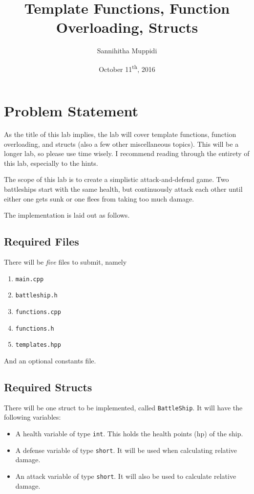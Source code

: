\documentclass[12pt]{article}
\title{Template Functions, Function Overloading, Structs}
\date{October 11\textsuperscript{th}, 2016}
\author{Sannihitha Muppidi}
\newcommand{\shellcmd}[1]{\texttt{\colorbox{gray!30}{#1}}}
\begin{document}
\maketitle

\section{Problem Statement}
As the title of this lab implies, the lab will cover template functions, function overloading, and structs (also a few other miscellaneous topics). This will be a longer lab, so please use time wisely. I recommend reading through the entirety of this lab, especially to the hints.

The scope of this lab is to create a simplistic attack-and-defend game. Two battleships start with the same health, but continuously attack each other until either one gets sunk or one flees from taking too much damage.

The implementation is laid out as follows.

\subsection*{Required Files}
There will be \textit{five} files to submit, namely

\begin{enumerate}
    \item \texttt{main.cpp}
    \item \texttt{battleship.h}
    \item \texttt{functions.cpp}
    \item \texttt{functions.h}
    \item \texttt{templates.hpp}
\end{enumerate}

And an optional constants file.

\subsection*{Required Structs}
There will be one struct to be implemented, called \texttt{BattleShip}. It will have the following variables:

\begin{itemize}
    \item A health variable of type \shellcmd{int}. This holds the health points (hp) of the ship.
    \item A defense variable of type \shellcmd{short}. It will be used when calculating relative damage.
    \item An attack variable of type \shellcmd{short}. It will also be used to calculate relative damage.
\end{itemize}
\end{document}
